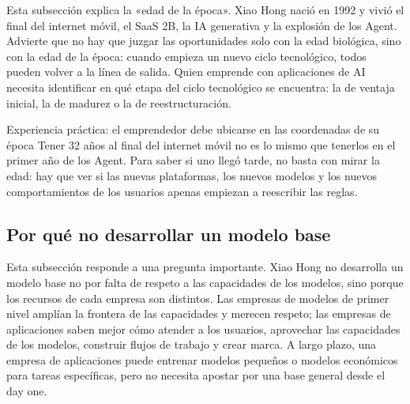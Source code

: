 \documentclass[a4paper]{article}
\begin{document}
Esta subsección explica la «edad de la época». Xiao Hong nació en 1992 y vivió el final del internet móvil, el SaaS 2B, la IA generativa y la explosión de los Agent. Advierte que no hay que juzgar las oportunidades solo con la edad biológica, sino con la edad de la época: cuando empieza un nuevo ciclo tecnológico, todos pueden volver a la línea de salida. Quien emprende con aplicaciones de AI necesita identificar en qué etapa del ciclo tecnológico se encuentra: la de ventaja inicial, la de madurez o la de reestructuración.

\begin{importantbox}{Experiencia práctica: el emprendedor debe ubicarse en las coordenadas de su época}
Tener 32 años al final del internet móvil no es lo mismo que tenerlos en el primer año de los Agent. Para saber si uno llegó tarde, no basta con mirar la edad: hay que ver si las nuevas plataformas, los nuevos modelos y los nuevos comportamientos de los usuarios apenas empiezan a reescribir las reglas.
\end{importantbox}

\subsection{Por qué no desarrollar un modelo base}

Esta subsección responde a una pregunta importante. Xiao Hong no desarrolla un modelo base no por falta de respeto a las capacidades de los modelos, sino porque los recursos de cada empresa son distintos. Las empresas de modelos de primer nivel amplían la frontera de las capacidades y merecen respeto; las empresas de aplicaciones saben mejor cómo atender a los usuarios, aprovechar las capacidades de los modelos, construir flujos de trabajo y crear marca. A largo plazo, una empresa de aplicaciones puede entrenar modelos pequeños o modelos económicos para tareas específicas, pero no necesita apostar por una base general desde el day one.
\end{document}
